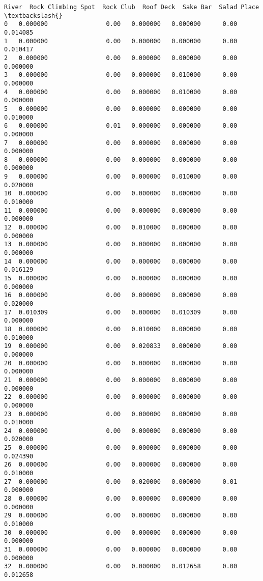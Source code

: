 \documentclass[11pt]{article}
\begin{document}
\begin{tcolorbox}[breakable, size=fbox, boxrule=.5pt, pad at break*=1mm, opacityfill=0]
\begin{Verbatim}[commandchars=\\\{\}]
       River  Rock Climbing Spot  Rock Club  Roof Deck  Sake Bar  Salad Place  \textbackslash{}
0   0.000000                0.00   0.000000   0.000000      0.00     0.014085
1   0.000000                0.00   0.000000   0.000000      0.00     0.010417
2   0.000000                0.00   0.000000   0.000000      0.00     0.000000
3   0.000000                0.00   0.000000   0.010000      0.00     0.000000
4   0.000000                0.00   0.000000   0.010000      0.00     0.000000
5   0.000000                0.00   0.000000   0.000000      0.00     0.010000
6   0.000000                0.01   0.000000   0.000000      0.00     0.000000
7   0.000000                0.00   0.000000   0.000000      0.00     0.000000
8   0.000000                0.00   0.000000   0.000000      0.00     0.000000
9   0.000000                0.00   0.000000   0.010000      0.00     0.020000
10  0.000000                0.00   0.000000   0.000000      0.00     0.010000
11  0.000000                0.00   0.000000   0.000000      0.00     0.000000
12  0.000000                0.00   0.010000   0.000000      0.00     0.000000
13  0.000000                0.00   0.000000   0.000000      0.00     0.000000
14  0.000000                0.00   0.000000   0.000000      0.00     0.016129
15  0.000000                0.00   0.000000   0.000000      0.00     0.000000
16  0.000000                0.00   0.000000   0.000000      0.00     0.020000
17  0.010309                0.00   0.000000   0.010309      0.00     0.000000
18  0.000000                0.00   0.010000   0.000000      0.00     0.010000
19  0.000000                0.00   0.020833   0.000000      0.00     0.000000
20  0.000000                0.00   0.000000   0.000000      0.00     0.000000
21  0.000000                0.00   0.000000   0.000000      0.00     0.000000
22  0.000000                0.00   0.000000   0.000000      0.00     0.000000
23  0.000000                0.00   0.000000   0.000000      0.00     0.010000
24  0.000000                0.00   0.000000   0.000000      0.00     0.020000
25  0.000000                0.00   0.000000   0.000000      0.00     0.024390
26  0.000000                0.00   0.000000   0.000000      0.00     0.010000
27  0.000000                0.00   0.020000   0.000000      0.01     0.000000
28  0.000000                0.00   0.000000   0.000000      0.00     0.000000
29  0.000000                0.00   0.000000   0.000000      0.00     0.010000
30  0.000000                0.00   0.000000   0.000000      0.00     0.000000
31  0.000000                0.00   0.000000   0.000000      0.00     0.000000
32  0.000000                0.00   0.000000   0.012658      0.00     0.012658

\end{Verbatim}
\end{tcolorbox}
\end{document}
